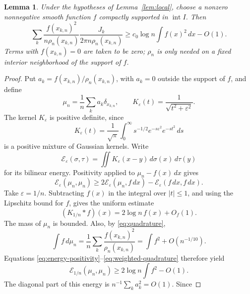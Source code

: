 \documentclass[11pt]{article}
\newtheorem{lemma}[theorem]{Lemma}
\numberwithin{equation}{section}
\begin{document}
\begin{lemma}\label{lem:energy}
Under the hypotheses of Lemma~\ref{lem:local}, choose a nonzero nonnegative
smooth function \(f\) compactly supported in \(\operatorname{int}I\). Then
\begin{equation}\label{eq:jump-average}
 \sum_k\frac{f(x_{k,n})^2}{n\rho_n(x_{k,n})}
       \frac{J_k}{2\pi n\rho_n(x_{k,n})}
 \ge c_0\log n\int f(x)^2\,dx-O(1).
\end{equation}
Terms with \(f(x_{k,n})=0\) are taken to be zero; \(\rho_n\) is only needed on
a fixed interior neighborhood of the support of \(f\).

\end{lemma}

\begin{proof}
Put \(a_k=f(x_{k,n})/\rho_n(x_{k,n})\), with \(a_k=0\) outside the support of
\(f\), and define
\[
 \mu_n=\frac1n\sum_k a_k\delta_{x_{k,n}},\qquad
 K_\varepsilon(t)=\frac1{\sqrt{t^2+\varepsilon^2}}.
\]
The kernel \(K_\varepsilon\) is positive definite, since
\[
 K_\varepsilon(t)=\frac1{\sqrt\pi}
       \int_0^\infty s^{-1/2}e^{-s\varepsilon^2}e^{-st^2}\,ds
\]
is a positive mixture of Gaussian kernels. Write
\[
 \mathcal E_\varepsilon(\sigma,\tau)
 =\iint K_\varepsilon(x-y)\,d\sigma(x)\,d\tau(y)
\]
for its bilinear energy. Positivity applied to
\(\mu_n-f(x)\,dx\) gives
\begin{equation}\label{eq:energy-positivity}
 \mathcal E_\varepsilon(\mu_n,\mu_n)
 \ge2\mathcal E_\varepsilon(\mu_n,f\,dx)
       -\mathcal E_\varepsilon(f\,dx,f\,dx).
\end{equation}
Take \(\varepsilon=1/n\). Subtracting \(f(x)\) in the integral over
\(|t|\le1\), and using the Lipschitz bound for \(f\), gives the uniform
estimate
\begin{equation}\label{eq:kernel-asymptotic}
 (K_{1/n}*f)(x)=2\log n\,f(x)+O_f(1).
\end{equation}
The mass of \(\mu_n\) is bounded. Also, by \eqref{eq:quadrature},
\begin{equation}\label{eq:weighted-quadrature}
 \int f\,d\mu_n
 =\frac1n\sum_k\frac{f(x_{k,n})^2}{\rho_n(x_{k,n})}
 =\int f^2+O(n^{-1/10}).
\end{equation}
Equations \eqref{eq:energy-positivity}--\eqref{eq:weighted-quadrature}
therefore yield
\begin{equation}\label{eq:energy-lower}
 \mathcal E_{1/n}(\mu_n,\mu_n)
 \ge2\log n\int f^2-O(1).
\end{equation}
The diagonal part of this energy is \(n^{-1}\sum_k a_k^2=O(1)\). Since

\end{proof}
\end{document}
